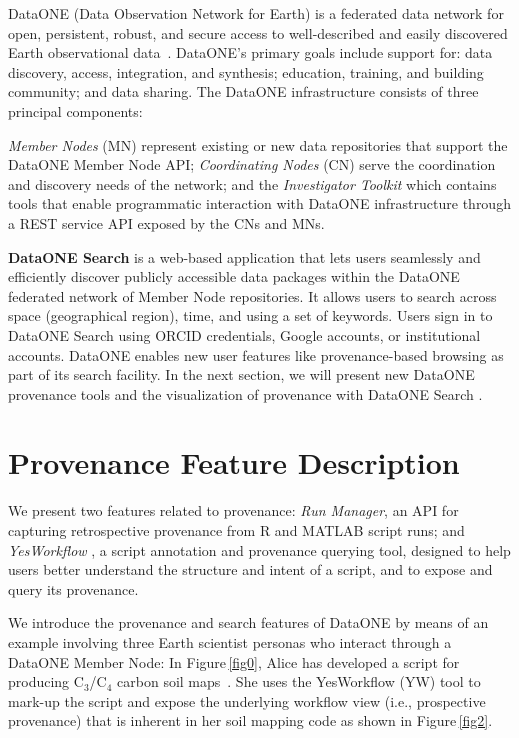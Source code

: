 \documentclass[a4paper]{llncs}
\newcommand{\mypara}[1]{\vspace{4pt}\noindent\textbf{#1}}
\newcommand{\Figref}[1]{Figure\,\ref{#1}}
\begin{document}
DataONE (Data Observation Network for Earth) is a federated data network for open, persistent, robust, and secure access to well-described and easily discovered Earth observational data~\cite{dataone}. DataONE's primary goals include support for: data discovery, access, integration, and synthesis; education, training, and building community; and data sharing. The DataONE infrastructure consists of three principal components:

\emph{Member Nodes} (MN) represent existing or new data repositories that support the DataONE Member Node API; \emph{Coordinating Nodes} (CN) serve the coordination and discovery needs of the network; and the \emph{Investigator Toolkit} which contains tools that enable programmatic interaction with DataONE infrastructure through a REST service API exposed by the CNs and MNs.


\mypara{DataONE Search} is a web-based application that lets users seamlessly and efficiently discover publicly accessible data packages within the DataONE federated network of Member Node repositories. It allows users to search across space (geographical region), time, and using a set of keywords. Users sign in to DataONE Search using ORCID credentials, Google accounts, or institutional accounts. DataONE enables new user features like provenance-based browsing as part of its search facility. In the next section, we will present new DataONE provenance tools and the visualization of provenance with DataONE Search \cite{dataone}.


\section{Provenance Feature Description}  \label{demo}

We present two features related to provenance: \emph{Run Manager}, an API for capturing retrospective provenance from R \cite{recordr} and MATLAB \cite{matlabdataone} script runs; and \emph{YesWorkflow} \cite{yesworkflow}, a script annotation and provenance querying tool, designed to help users better understand the structure and intent of a script, and to expose and query its provenance.

We introduce the provenance and search features of DataONE by means of an example involving three Earth scientist personas who interact through a DataONE Member Node: In \Figref{fig0}, Alice has developed a script for producing C$_3$/C$_4$ carbon soil maps~\cite{MsTMIP-model-driver-data-set}.  She uses the YesWorkflow (YW) tool to mark-up the script and expose the underlying workflow view (i.e., prospective provenance) that is inherent in her soil mapping code as shown in \Figref{fig2}.
\end{document}
